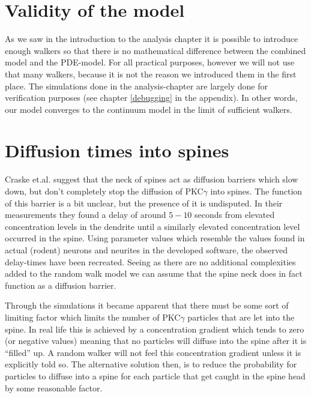 \section{Validity of the model}
As we saw in the introduction to the analysis chapter it is possible to introduce enough walkers so that there is no mathematical difference between the combined model and the PDE-model. 
For all practical purposes, however we will not use that many walkers, because it is not the reason we introduced them in the first place. 
The simulations done in the analysis-chapter are largely done for verification purposes (see chapter \ref{debugging} in the appendix).
In other words, our model converges to the continuum model in the limit of sufficient walkers.


\section{Diffusion times into spines}

Craske et.al. suggest that the neck of spines act as diffusion barriers which slow down, but don't completely stop the diffusion of PKC$\gamma$ into spines. 
The function of this barrier is a bit unclear, but the presence of it is undisputed. 
In their measurements they found a delay of around $5-10$ seconds from elevated concentration levels in the dendrite until a similarly elevated concentration level occurred in the spine. 
Using parameter values which resemble the values found in actual (rodent) neurons and neurites in the developed software, the observed delay-times have been recreated. 
Seeing as there are no additional complexities added to the random walk model we can assume that the spine neck does in fact function as a diffusion barrier.

Through the simulations it became apparent that there must be some sort of limiting factor which limits the number of PKC$\gamma$ particles that are let into the spine. 
In real life this is achieved by a concentration gradient which tends to zero (or negative values) meaning that no particles will diffuse into the spine after it is ``filled'' up. 
A random walker will not feel this concentration gradient unless it is explicitly told so. 
The alternative solution then, is to reduce the probability for particles to diffuse into a spine for each particle that get caught in the spine head by some reasonable factor. 